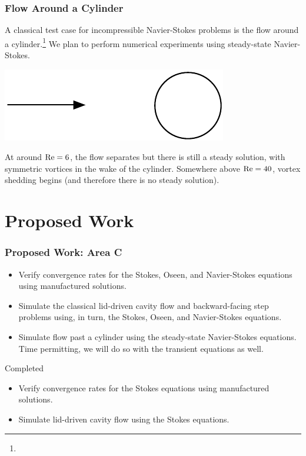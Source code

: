 \documentclass[mathserif]{beamer}
\newcommand{\FootSize}{\scriptsize}
\begin{document}
\begin{frame}
\frametitle{Flow Around a Cylinder}
A classical test case for incompressible Navier-Stokes problems is the flow around a cylinder.\footnote{\FootSize {}}  We plan to perform numerical experiments using steady-state Navier-Stokes.

\vspace{10mm}

\begin{center}
{\includegraphics[scale=0.50]{../figures/flowPastCylinder.pdf}}
\end{center}

\pause
At around ${\rm Re}=6$, the flow separates but there is still a steady solution, with symmetric vortices in the wake of the cylinder.  Somewhere above ${\rm Re}=40$, vortex shedding begins (and therefore there is no steady solution).

\end{frame}

\section{Proposed Work} %
\begin{frame}
\frametitle{Proposed Work: Area C}
\begin{block}{}
\begin{itemize}
\item Verify convergence rates for the Stokes, Oseen, and Navier-Stokes equations using manufactured solutions.
\item Simulate the classical lid-driven cavity flow and backward-facing step problems using, in turn, the Stokes, Oseen, and Navier-Stokes equations.
\item Simulate flow past a cylinder using the steady-state Navier-Stokes equations.  Time permitting, we will do so with the transient equations as well.
\end{itemize}
\end{block}

\begin{block}{Completed}
\begin{itemize}
\item Verify convergence rates for the Stokes equations using manufactured solutions.
\item Simulate lid-driven cavity flow using the Stokes equations.
\end{itemize}
\end{block}

\end{frame}
\end{document}
